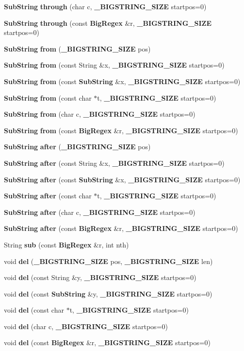 \begin{CompactItemize}
{\bf Sub\-String} {\bf through} (char c, {\bf \_\-BIGSTRING\_\-SIZE} startpos=0)
\item 
{\bf Sub\-String} {\bf through} (const {\bf Big\-Regex} \&r, {\bf \_\-BIGSTRING\_\-SIZE} startpos=0)
\item 
{\bf Sub\-String} {\bf from} ({\bf \_\-BIGSTRING\_\-SIZE} pos)
\item 
{\bf Sub\-String} {\bf from} (const String \&x, {\bf \_\-BIGSTRING\_\-SIZE} startpos=0)
\item 
{\bf Sub\-String} {\bf from} (const {\bf Sub\-String} \&x, {\bf \_\-BIGSTRING\_\-SIZE} startpos=0)
\item 
{\bf Sub\-String} {\bf from} (const char $\ast$t, {\bf \_\-BIGSTRING\_\-SIZE} startpos=0)
\item 
{\bf Sub\-String} {\bf from} (char c, {\bf \_\-BIGSTRING\_\-SIZE} startpos=0)
\item 
{\bf Sub\-String} {\bf from} (const {\bf Big\-Regex} \&r, {\bf \_\-BIGSTRING\_\-SIZE} startpos=0)
\item 
{\bf Sub\-String} {\bf after} ({\bf \_\-BIGSTRING\_\-SIZE} pos)
\item 
{\bf Sub\-String} {\bf after} (const String \&x, {\bf \_\-BIGSTRING\_\-SIZE} startpos=0)
\item 
{\bf Sub\-String} {\bf after} (const {\bf Sub\-String} \&x, {\bf \_\-BIGSTRING\_\-SIZE} startpos=0)
\item 
{\bf Sub\-String} {\bf after} (const char $\ast$t, {\bf \_\-BIGSTRING\_\-SIZE} startpos=0)
\item 
{\bf Sub\-String} {\bf after} (char c, {\bf \_\-BIGSTRING\_\-SIZE} startpos=0)
\item 
{\bf Sub\-String} {\bf after} (const {\bf Big\-Regex} \&r, {\bf \_\-BIGSTRING\_\-SIZE} startpos=0)
\item 
String {\bf sub} (const {\bf Big\-Regex} \&r, int nth)
\item 
void {\bf del} ({\bf \_\-BIGSTRING\_\-SIZE} pos, {\bf \_\-BIGSTRING\_\-SIZE} len)
\item 
void {\bf del} (const String \&y, {\bf \_\-BIGSTRING\_\-SIZE} startpos=0)
\item 
void {\bf del} (const {\bf Sub\-String} \&y, {\bf \_\-BIGSTRING\_\-SIZE} startpos=0)
\item 
void {\bf del} (const char $\ast$t, {\bf \_\-BIGSTRING\_\-SIZE} startpos=0)
\item 
void {\bf del} (char c, {\bf \_\-BIGSTRING\_\-SIZE} startpos=0)
\item 
void {\bf del} (const {\bf Big\-Regex} \&r, {\bf \_\-BIGSTRING\_\-SIZE} startpos=0)

\end{CompactItemize}
